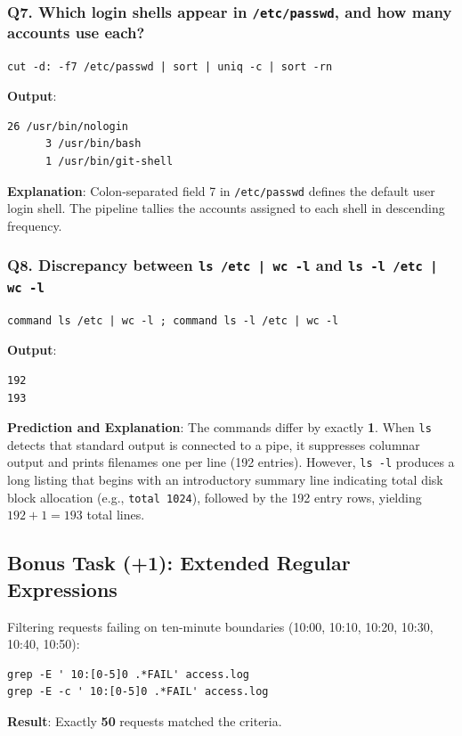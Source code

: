 \documentclass[12pt,a4paper]{article}
\begin{document}
\subsubsection*{Q7. Which login shells appear in \texttt{/etc/passwd}, and how many accounts use each?}
\begin{lstlisting}[style=bashstyle]
cut -d: -f7 /etc/passwd | sort | uniq -c | sort -rn
\end{lstlisting}
\textbf{Output}:
\begin{lstlisting}[style=consolestyle]
     26 /usr/bin/nologin
      3 /usr/bin/bash
      1 /usr/bin/git-shell
\end{lstlisting}
\textbf{Explanation}: Colon-separated field 7 in \texttt{/etc/passwd} defines the default user login shell. The pipeline tallies the accounts assigned to each shell in descending frequency.

\subsubsection*{Q8. Discrepancy between \texttt{ls /etc | wc -l} and \texttt{ls -l /etc | wc -l}}
\begin{lstlisting}[style=bashstyle]
command ls /etc | wc -l ; command ls -l /etc | wc -l
\end{lstlisting}
\textbf{Output}:
\begin{lstlisting}[style=consolestyle]
192
193
\end{lstlisting}
\textbf{Prediction and Explanation}: The commands differ by exactly \textbf{1}. When \texttt{ls} detects that standard output is connected to a pipe, it suppresses columnar output and prints filenames one per line (192 entries). However, \texttt{ls -l} produces a long listing that begins with an introductory summary line indicating total disk block allocation (e.g., \texttt{total 1024}), followed by the 192 entry rows, yielding $192 + 1 = 193$ total lines.

\subsection{Bonus Task (+1): Extended Regular Expressions}
Filtering requests failing on ten-minute boundaries (10:00, 10:10, 10:20, 10:30, 10:40, 10:50):
\begin{lstlisting}[style=bashstyle]
grep -E ' 10:[0-5]0 .*FAIL' access.log
grep -E -c ' 10:[0-5]0 .*FAIL' access.log
\end{lstlisting}
\textbf{Result}: Exactly \textbf{50} requests matched the criteria.
\end{document}
